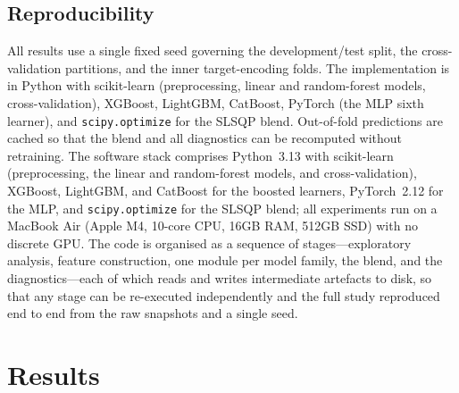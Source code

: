 \documentclass[journal]{IEEEtran}
\begin{document}
\subsection{Reproducibility}
All results use a single fixed seed governing the development/test split, the
cross-validation partitions, and the inner target-encoding folds. The
implementation is in Python with scikit-learn (preprocessing, linear and
random-forest models, cross-validation), XGBoost, LightGBM, CatBoost, PyTorch
(the MLP sixth learner), and
\texttt{scipy.optimize} for the SLSQP blend. Out-of-fold predictions are cached so
that the blend and all diagnostics can be recomputed without retraining. The
software stack comprises Python~3.13 with scikit-learn (preprocessing, the linear
and random-forest models, and cross-validation), XGBoost, LightGBM, and CatBoost
for the boosted learners, PyTorch~2.12 for the MLP, and \texttt{scipy.optimize} for
the SLSQP blend; all experiments run on a MacBook Air (Apple M4, 10-core CPU, 16GB
RAM, 512GB SSD) with no discrete GPU. The code is organised as a
sequence of stages---exploratory analysis, feature construction, one module per
model family, the blend, and the diagnostics---each of which reads and writes
intermediate artefacts to disk, so that any stage can be re-executed independently
and the full study reproduced end to end from the raw snapshots and a single seed.

\section{Results}
\label{sec:results}
\end{document}
